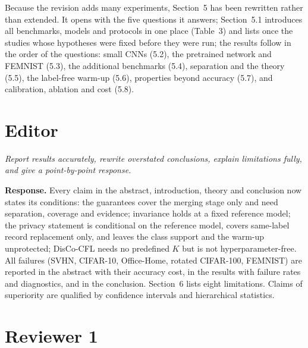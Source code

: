 \documentclass[11pt]{article}
\newenvironment{revcomment}{\par\medskip\noindent\begin{minipage}{\linewidth}\color{blue!45!black}\itshape}{\end{minipage}\par\smallskip}
\newcommand{\resp}{\par\noindent\textbf{Response.} }
\begin{document}
Because the revision adds many experiments, Section~5 has been rewritten rather than extended. It opens with the five questions it answers; Section~5.1 introduces all benchmarks, models and protocols in one place (Table~3) and lists once the studies whose hypotheses were fixed before they were run; the results follow in the order of the questions: small CNNs (5.2), the pretrained network and FEMNIST (5.3), the additional benchmarks (5.4), separation and the theory (5.5), the label-free warm-up (5.6), properties beyond accuracy (5.7), and calibration, ablation and cost (5.8).

\section*{Editor}

\begin{revcomment}
Report results accurately, rewrite overstated conclusions, explain limitations fully, and give a point-by-point response.
\end{revcomment}
\resp Every claim in the abstract, introduction, theory and conclusion now states its conditions: the guarantees cover the merging stage only and need separation, coverage and evidence; invariance holds at a fixed reference model; the privacy statement is conditional on the reference model, covers same-label record replacement only, and leaves the class support and the warm-up unprotected; DisCo-CFL needs no predefined $K$ but is not hyperparameter-free. All failures (SVHN, CIFAR-10, Office-Home, rotated CIFAR-100, FEMNIST) are reported in the abstract with their accuracy cost, in the results with failure rates and diagnostics, and in the conclusion. Section~6 lists eight limitations. Claims of superiority are qualified by confidence intervals and hierarchical statistics.

\section*{Reviewer 1}
\end{document}
